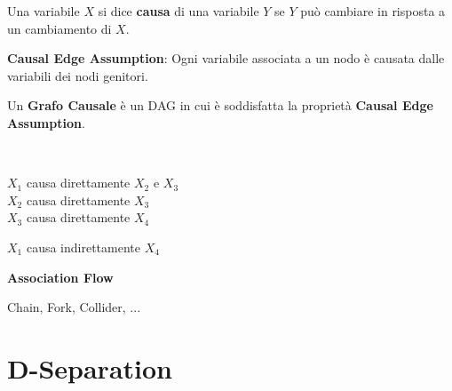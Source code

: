 Una variabile $X$ si dice \textbf{causa} di una variabile $Y$ se $Y$ può
cambiare in risposta a un cambiamento di $X$.

\textbf{Causal Edge Assumption}:
Ogni variabile associata a un nodo è causata dalle variabili dei nodi genitori.

Un \textbf{Grafo Causale} è un DAG in cui è soddisfatta la proprietà \textbf{Causal Edge Assumption}.

\bigskip
\begin{minipage}[c]{0.3\linewidth}
  \vspace{0pt}\
\end{minipage}
%
\begin{minipage}[c]{0.4\linewidth}
  $X_1$ causa direttamente $X_2$ e $X_3$\\
  $X_2$ causa direttamente $X_3$\\
  $X_3$ causa direttamente $X_4$

  \bigskip
  $X_1$ causa indirettamente $X_4$
\end{minipage}

\vspace{20mm}

\textbf{Association Flow}

Chain, Fork, Collider, ...

\section{D-Separation}
